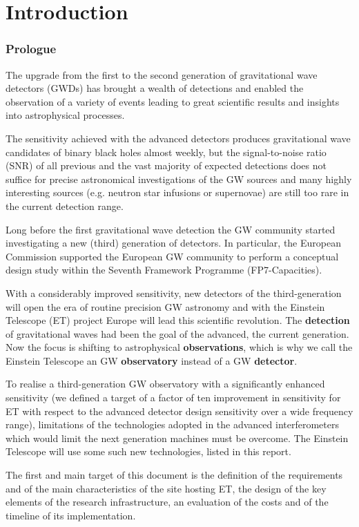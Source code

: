 \chapter{Introduction}
\label{chap:Intro}

\subsection[Prologue]{Prologue}
\label{Prologue}

The upgrade from the first to the second generation of gravitational wave detectors (GWDs) has brought a wealth of detections and enabled the observation of a variety of events leading to great scientific results and insights into astrophysical processes. 

The sensitivity achieved with the advanced detectors produces gravitational wave candidates of binary black holes almost weekly, but the signal-to-noise ratio (SNR) of all previous and the vast majority of expected detections does not suffice for precise astronomical investigations of the GW sources and many highly interesting sources (e.g. neutron star infusions or supernovae) are still too rare in the current detection range. \par    
Long before the first gravitational wave detection the GW community started investigating a new (third) generation of detectors. In particular, the European Commission supported the European GW community to perform a conceptual design study within the Seventh Framework Programme (FP7-Capacities).\par 
With a considerably improved sensitivity, new detectors of the third-generation will open the era of routine precision GW astronomy and with the Einstein Telescope (ET) project Europe will lead this scientific revolution. The \textbf{detection} of gravitational waves had been the goal of the advanced, the current generation. Now the focus is shifting to astrophysical \textbf{observations}, which is why we call the Einstein Telescope an GW \textbf{observatory} instead of a GW \textbf{detector}.\par
To realise a third-generation GW observatory with a significantly enhanced sensitivity (we defined a target of a factor of ten improvement in sensitivity for ET with respect to the advanced detector design sensitivity over a wide frequency range), limitations of the technologies adopted in the advanced interferometers which would limit the next generation machines must be overcome. The Einstein Telescope will use some such new technologies, listed in this report.\par
The first and main target of this document is the definition of  the requirements and of the main characteristics of the site hosting ET, the design of the key elements of the research infrastructure, an evaluation of the costs and of the timeline of its implementation.

